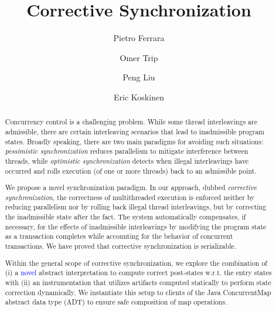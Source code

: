 \documentclass{llncs}
\newcommand\blue[1]{\textcolor{blue}{#1}}
\begin{document}
\title{Corrective Synchronization}



\author{
  Pietro Ferrara 
  \and Omer Trip 
  \and Peng Liu 
  \and Eric Koskinen 
}
\maketitle

\begin{abstract}
Concurrency control is a challenging problem. While some thread interleavings are admissible, there are certain interleaving scenarios that lead to inadmissible program states. Broadly speaking, there are two main paradigms for avoiding such situations: \emph{pessimistic synchronization} reduces parallelism to mitigate interference between threads, while \emph{optimistic synchronization} detects when illegal interleavings have occurred and rolls execution (of one or more threads) back to an admissible point.

We propose a novel synchronization paradigm. In our approach, dubbed \emph{corrective synchronization}, the correctness of multithreaded execution is enforced neither by reducing parallelism nor by rolling back illegal thread interleavings, but by correcting the inadmissible state after the fact. The system automatically compensates, if necessary, for the effects of inadmissible interleavings by modifying the program state as a transaction completes while accounting for the behavior of concurrent transactions. We have proved that corrective synchronization is serializable.

Within the general scope of corrective synchronization, we explore the combination of (i) a \blue{novel} abstract interpretation to compute correct post-states w.r.t. the entry states with (ii) an instrumentation that utilizes  artifacts computed statically to perform state correction dynamically. We instantiate this setup to clients of the Java {\sf ConcurrentMap} abstract data type (ADT) to ensure safe composition of map operations.

\end{abstract}
\end{document}
